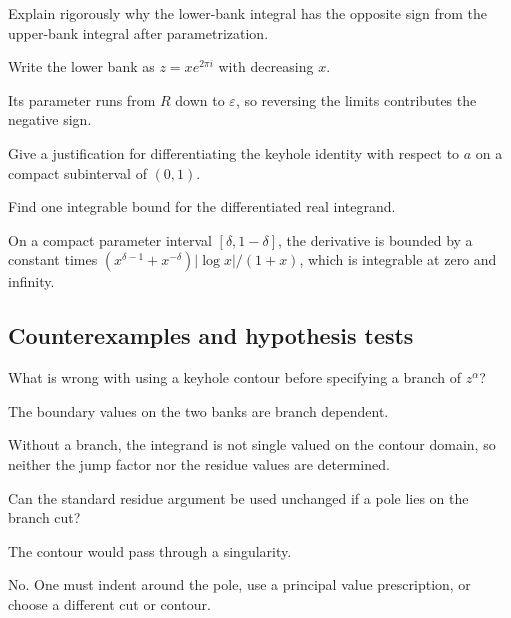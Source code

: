 \begin{exercise}\label{exr:iv21-expand-08}
Explain rigorously why the lower-bank integral has the opposite sign from the upper-bank integral after parametrization.
\end{exercise}
\begin{hint}
Write the lower bank as \(z=x e^{2\pi i}\) with decreasing \(x\).
\end{hint}
\begin{solution}
Its parameter runs from \(R\) down to \(\varepsilon\), so reversing the limits contributes the negative sign.
\end{solution}

\begin{exercise}\label{exr:iv21-expand-09}
Give a justification for differentiating the keyhole identity with respect to \(a\) on a compact subinterval of \((0,1)\).
\end{exercise}
\begin{hint}
Find one integrable bound for the differentiated real integrand.
\end{hint}
\begin{solution}
On a compact parameter interval \([\delta,1-\delta]\), the derivative is bounded by a constant times \((x^{\delta-1}+x^{-\delta})|\log x|/(1+x)\), which is integrable at zero and infinity.
\end{solution}

\subsection*{Counterexamples and hypothesis tests}

\begin{exercise}\label{exr:iv21-expand-10}
What is wrong with using a keyhole contour before specifying a branch of \(z^\alpha\)?
\end{exercise}
\begin{hint}
The boundary values on the two banks are branch dependent.
\end{hint}
\begin{solution}
Without a branch, the integrand is not single valued on the contour domain, so neither the jump factor nor the residue values are determined.
\end{solution}

\begin{exercise}\label{exr:iv21-expand-11}
Can the standard residue argument be used unchanged if a pole lies on the branch cut?
\end{exercise}
\begin{hint}
The contour would pass through a singularity.
\end{hint}
\begin{solution}
No. One must indent around the pole, use a principal value prescription, or choose a different cut or contour.
\end{solution}


